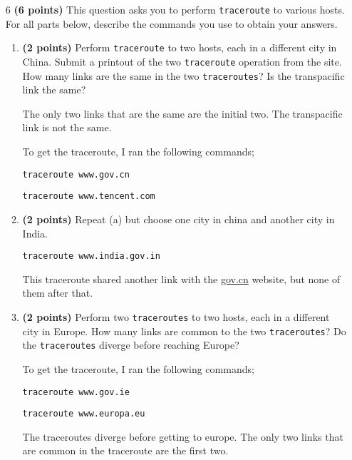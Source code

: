\documentclass{article}
\begin{document}
\begin{enumerate}
\item[6]\textbf{(6 points)} This question asks you to perform \texttt{traceroute} to various hosts. For all parts below, describe the commands you use to obtain your answers.

\begin{enumerate}
\item \textbf{(2 points)} Perform \texttt{traceroute} to two hosts, each in a different city in China. Submit a printout of the two \texttt{traceroute} operation from the site. How many links are the same in the two \texttt{traceroutes}? Is the transpacific link the same?

The only two links that are the same are the initial two. The transpacific link is not the same.

To get the traceroute, I ran the following commands;

\texttt{traceroute www.gov.cn}

\texttt{traceroute www.tencent.com}

\item \textbf{(2 points)} Repeat (a) but choose one city in china and another city in India.

\texttt{traceroute www.india.gov.in}

This traceroute shared another link with the \url{gov.cn} website, but none of them after that.

\item \textbf{(2 points)} Perform two \texttt{traceroutes} to two hosts, each in a different city in Europe. How many links are common to the two \texttt{traceroutes}? Do the \texttt{traceroutes} diverge before reaching Europe?

To get the traceroute, I ran the following commands;

\texttt{traceroute www.gov.ie}

\texttt{traceroute www.europa.eu}

The traceroutes diverge before getting to europe. The only two links that are common in the traceroute are the first two.
\end{enumerate}
\end{enumerate}
\end{document}
